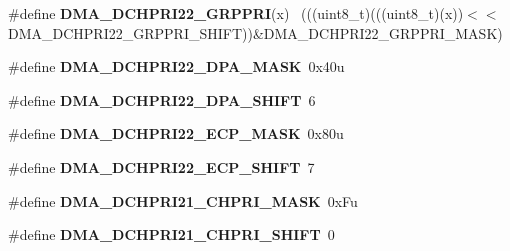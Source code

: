 \begin{DoxyCompactItemize}
\item 
\hypertarget{group___d_m_a___register___masks_ga5a602c7b22c38a7f6623aa489254af89}{}\#define {\bfseries D\+M\+A\+\_\+\+D\+C\+H\+P\+R\+I22\+\_\+\+G\+R\+P\+P\+R\+I}(x)                                  ~(((uint8\+\_\+t)(((uint8\+\_\+t)(x))$<$$<$D\+M\+A\+\_\+\+D\+C\+H\+P\+R\+I22\+\_\+\+G\+R\+P\+P\+R\+I\+\_\+\+S\+H\+I\+F\+T))\&D\+M\+A\+\_\+\+D\+C\+H\+P\+R\+I22\+\_\+\+G\+R\+P\+P\+R\+I\+\_\+\+M\+A\+S\+K)\label{group___d_m_a___register___masks_ga5a602c7b22c38a7f6623aa489254af89}

\item 
\hypertarget{group___d_m_a___register___masks_gab6a48e19eaeae83eef34bc09942d00f9}{}\#define {\bfseries D\+M\+A\+\_\+\+D\+C\+H\+P\+R\+I22\+\_\+\+D\+P\+A\+\_\+\+M\+A\+S\+K}~0x40u\label{group___d_m_a___register___masks_gab6a48e19eaeae83eef34bc09942d00f9}

\item 
\hypertarget{group___d_m_a___register___masks_ga5f45fa13a7addabf63f97358a5efd2de}{}\#define {\bfseries D\+M\+A\+\_\+\+D\+C\+H\+P\+R\+I22\+\_\+\+D\+P\+A\+\_\+\+S\+H\+I\+F\+T}~6\label{group___d_m_a___register___masks_ga5f45fa13a7addabf63f97358a5efd2de}

\item 
\hypertarget{group___d_m_a___register___masks_ga6d9ddd9dd3a4b6be7da07d85cc2c1a9c}{}\#define {\bfseries D\+M\+A\+\_\+\+D\+C\+H\+P\+R\+I22\+\_\+\+E\+C\+P\+\_\+\+M\+A\+S\+K}~0x80u\label{group___d_m_a___register___masks_ga6d9ddd9dd3a4b6be7da07d85cc2c1a9c}

\item 
\hypertarget{group___d_m_a___register___masks_ga98dc08e247169b98340c054a3150fe33}{}\#define {\bfseries D\+M\+A\+\_\+\+D\+C\+H\+P\+R\+I22\+\_\+\+E\+C\+P\+\_\+\+S\+H\+I\+F\+T}~7\label{group___d_m_a___register___masks_ga98dc08e247169b98340c054a3150fe33}

\item 
\hypertarget{group___d_m_a___register___masks_gaa4dd6a7d3b1bcdb442b568af2321c4d5}{}\#define {\bfseries D\+M\+A\+\_\+\+D\+C\+H\+P\+R\+I21\+\_\+\+C\+H\+P\+R\+I\+\_\+\+M\+A\+S\+K}~0x\+Fu\label{group___d_m_a___register___masks_gaa4dd6a7d3b1bcdb442b568af2321c4d5}

\item 
\hypertarget{group___d_m_a___register___masks_ga7f0db4c23f203f24fe97b7716d61fff3}{}\#define {\bfseries D\+M\+A\+\_\+\+D\+C\+H\+P\+R\+I21\+\_\+\+C\+H\+P\+R\+I\+\_\+\+S\+H\+I\+F\+T}~0\label{group___d_m_a___register___masks_ga7f0db4c23f203f24fe97b7716d61fff3}


\end{DoxyCompactItemize}
